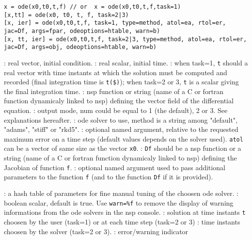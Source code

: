 
\begin{mandesc}
\end{mandesc}

\begin{calling_sequence}
\begin{verbatim}
x = ode(x0,t0,t,f) // or  x = ode(x0,t0,t,f,task=1)
[x,tt] = ode(x0, t0, t, f, task=2|3)
[x, ier] = ode(x0,t0,t,f, task=1, type=method, atol=ea, rtol=er, jac=Df, args=fpar, odeoptions=htable, warn=b)
[x, tt, ier] = ode(x0,t0,t,f, task=2|3, type=method, atol=ea, rtol=er, jac=Df, args=obj, odeoptions=htable, warn=b)
\end{verbatim}
\end{calling_sequence}
\begin{parameters}
  \begin{varlist}
    : real vector, initial condition.
    : real scalar, initial time.
    : when task=1, \verb+t+ should a real vector with time instants at which the solution must
    be computed and recorded (final integration time is \verb+t($)+); when task=2 or 3, \verb+t+ is a 
    scalar giving the final integration time.
    : nsp function or string (name of a C or fortran function dynamicaly linked to nsp) 
               defining the vector field of the differential equation.
    : output mode, num could be equal to 1 (the default), 2 or 3. See explanations hereafter.
    : ode solver to use, method is a string among  "default", "adams", "stiff" or "rkd5".
    : optional named argument, relative to the requested maximum error on a time step 
    (default values depends on the solver used). \verb+atol+ can be a vector of same size as 
    the vector \verb+x0+.
    : \verb+Df+ should be a nsp function or a string (name of a C or fortran function dynamicaly linked 
                    to nsp) defining the Jacobian of function \verb+f+.
    : optional named argument used to pass additional parameters to the function \verb+f+ 
    (and to the function \verb+Df+ if it is provided). 

    : a hash table of parameters for fine manual tuning of the choosen ode solver.
    : boolean scalar, default is true. Use \verb+warn=%f+ to remove the display of warning 
                    informations from the ode solvers in the nsp console.
    : solution at time instants \verb+t+ choosen by the user (task=1) or at each time step (task=2 or 3)
    : time instants choosen by the solver (task=2 or 3).
    : error/warning indicator 
  \end{varlist}
\end{parameters}

